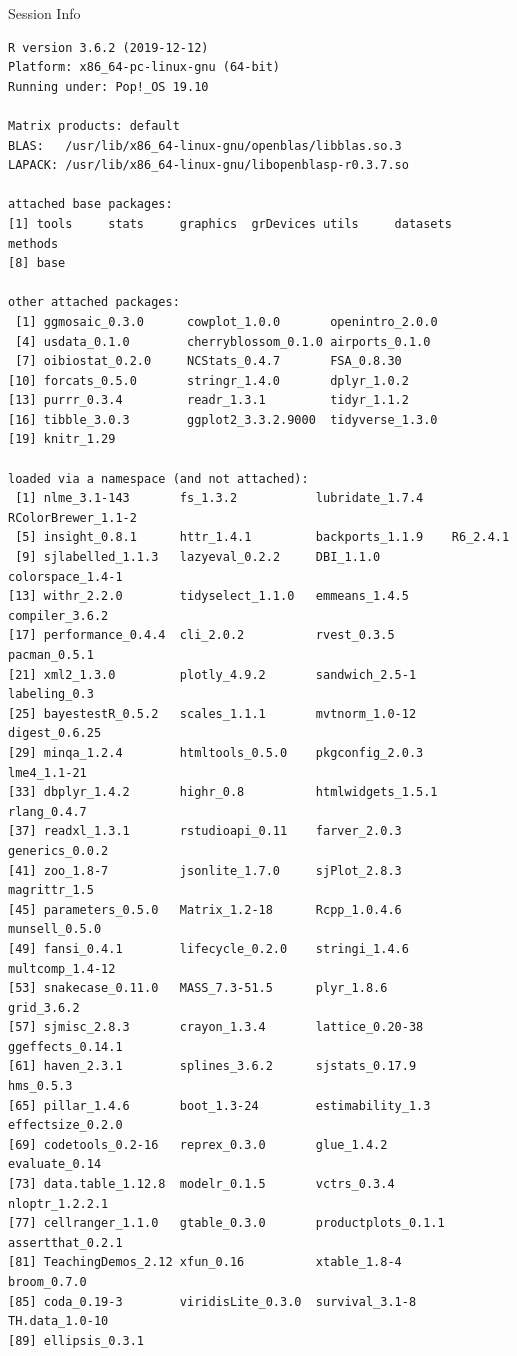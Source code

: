 \documentclass[10pt,handout]{beamer}\usepackage[]{graphicx}\usepackage[]{color}
\makeatletter
\newenvironment{kframe}{%
 \def\at@end@of@kframe{}%
 \ifinner\ifhmode%
  \def\at@end@of@kframe{\end{minipage}}%
  \begin{minipage}{\columnwidth}%
 \fi\fi%
 \def\FrameCommand##1{\hskip\@totalleftmargin \hskip-\fboxsep
 \colorbox{shadecolor}{##1}\hskip-\fboxsep
     \hskip-\linewidth \hskip-\@totalleftmargin \hskip\columnwidth}%
 \MakeFramed {\advance\hsize-\width
   \@totalleftmargin\z@ \linewidth\hsize
   \@setminipage}}%
 {\par\unskip\endMakeFramed%
 \at@end@of@kframe}
\newenvironment{knitrout}{}{} %
\makeatother
\begin{document}
\begin{frame}[fragile]{Session Info}
	\tiny
	
\begin{knitrout}\tiny
{}\color{fgcolor}\begin{kframe}
\begin{verbatim}
R version 3.6.2 (2019-12-12)
Platform: x86_64-pc-linux-gnu (64-bit)
Running under: Pop!_OS 19.10

Matrix products: default
BLAS:   /usr/lib/x86_64-linux-gnu/openblas/libblas.so.3
LAPACK: /usr/lib/x86_64-linux-gnu/libopenblasp-r0.3.7.so

attached base packages:
[1] tools     stats     graphics  grDevices utils     datasets  methods  
[8] base     

other attached packages:
 [1] ggmosaic_0.3.0      cowplot_1.0.0       openintro_2.0.0    
 [4] usdata_0.1.0        cherryblossom_0.1.0 airports_0.1.0     
 [7] oibiostat_0.2.0     NCStats_0.4.7       FSA_0.8.30         
[10] forcats_0.5.0       stringr_1.4.0       dplyr_1.0.2        
[13] purrr_0.3.4         readr_1.3.1         tidyr_1.1.2        
[16] tibble_3.0.3        ggplot2_3.3.2.9000  tidyverse_1.3.0    
[19] knitr_1.29         

loaded via a namespace (and not attached):
 [1] nlme_3.1-143       fs_1.3.2           lubridate_1.7.4    RColorBrewer_1.1-2
 [5] insight_0.8.1      httr_1.4.1         backports_1.1.9    R6_2.4.1          
 [9] sjlabelled_1.1.3   lazyeval_0.2.2     DBI_1.1.0          colorspace_1.4-1  
[13] withr_2.2.0        tidyselect_1.1.0   emmeans_1.4.5      compiler_3.6.2    
[17] performance_0.4.4  cli_2.0.2          rvest_0.3.5        pacman_0.5.1      
[21] xml2_1.3.0         plotly_4.9.2       sandwich_2.5-1     labeling_0.3      
[25] bayestestR_0.5.2   scales_1.1.1       mvtnorm_1.0-12     digest_0.6.25     
[29] minqa_1.2.4        htmltools_0.5.0    pkgconfig_2.0.3    lme4_1.1-21       
[33] dbplyr_1.4.2       highr_0.8          htmlwidgets_1.5.1  rlang_0.4.7       
[37] readxl_1.3.1       rstudioapi_0.11    farver_2.0.3       generics_0.0.2    
[41] zoo_1.8-7          jsonlite_1.7.0     sjPlot_2.8.3       magrittr_1.5      
[45] parameters_0.5.0   Matrix_1.2-18      Rcpp_1.0.4.6       munsell_0.5.0     
[49] fansi_0.4.1        lifecycle_0.2.0    stringi_1.4.6      multcomp_1.4-12   
[53] snakecase_0.11.0   MASS_7.3-51.5      plyr_1.8.6         grid_3.6.2        
[57] sjmisc_2.8.3       crayon_1.3.4       lattice_0.20-38    ggeffects_0.14.1  
[61] haven_2.3.1        splines_3.6.2      sjstats_0.17.9     hms_0.5.3         
[65] pillar_1.4.6       boot_1.3-24        estimability_1.3   effectsize_0.2.0  
[69] codetools_0.2-16   reprex_0.3.0       glue_1.4.2         evaluate_0.14     
[73] data.table_1.12.8  modelr_0.1.5       vctrs_0.3.4        nloptr_1.2.2.1    
[77] cellranger_1.1.0   gtable_0.3.0       productplots_0.1.1 assertthat_0.2.1  
[81] TeachingDemos_2.12 xfun_0.16          xtable_1.8-4       broom_0.7.0       
[85] coda_0.19-3        viridisLite_0.3.0  survival_3.1-8     TH.data_1.0-10    
[89] ellipsis_0.3.1    
\end{verbatim}
\end{kframe}
\end{knitrout}
	
\end{frame}
\end{document}
